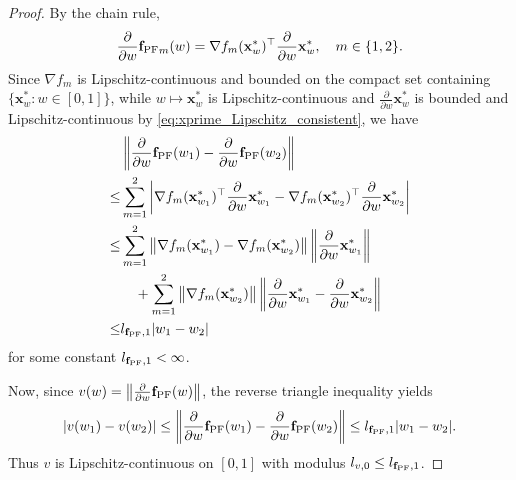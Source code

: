 \documentclass{article}
\newcommand{\bx}{\mathbf{x}}
\newcommand{\fPF}{{\mathbf{f}_{\rm PF}}}
\begin{document}
\begin{proof}
By the chain rule,
\begin{align}
\frac{\partial}{\partial w}\fPF_m(w)
=
\nabla f_m(\bx_w^*)^\top \frac{\partial}{\partial w}\bx_w^*,
\quad m\in\{1,2\}.
\end{align}
Since $\nabla f_m$ is Lipschitz-continuous and bounded on the compact set containing
$\{\bx_w^*:w\in[0,1]\}$, while $w\mapsto \bx_w^*$ is Lipschitz-continuous and
$\frac{\partial}{\partial w}\bx_w^*$ is bounded and Lipschitz-continuous by \eqref{eq:xprime_Lipschitz_consistent}, we have
\begin{align}
& \left\|
\frac{\partial}{\partial w}\fPF(w_1)
-
\frac{\partial}{\partial w}\fPF(w_2)
\right\|
\nonumber\\
\leq &
\sum_{m=1}^2
\left|
\nabla f_m(\bx_{w_1}^*)^\top \frac{\partial}{\partial w}\bx_{w_1}^*
-
\nabla f_m(\bx_{w_2}^*)^\top \frac{\partial}{\partial w}\bx_{w_2}^*
\right|
\nonumber\\
\leq &
\sum_{m=1}^2
\left\|
\nabla f_m(\bx_{w_1}^*)-\nabla f_m(\bx_{w_2}^*)
\right\|
\left\|
\frac{\partial}{\partial w}\bx_{w_1}^*
\right\|
\nonumber\\
&\quad+
\sum_{m=1}^2
\left\|
\nabla f_m(\bx_{w_2}^*)
\right\|
\left\|
\frac{\partial}{\partial w}\bx_{w_1}^*
-
\frac{\partial}{\partial w}\bx_{w_2}^*
\right\|
\nonumber\\
\leq &
l_{\fPF,1}|w_1-w_2|
\end{align}
for some constant $l_{\fPF,1}<\infty$.

Now, since $v(w)=\left\|\frac{\partial}{\partial w}\fPF(w)\right\|$, the reverse triangle inequality yields
\begin{align}
|v(w_1)-v(w_2)|
\le
\left\|
\frac{\partial}{\partial w}\fPF(w_1)
-
\frac{\partial}{\partial w}\fPF(w_2)
\right\|
\le
l_{\fPF,1}|w_1-w_2|.
\end{align}
Thus $v$ is Lipschitz-continuous on $[0,1]$ with modulus $l_{v,0}\le l_{\fPF,1}$.


\end{proof}
\end{document}
